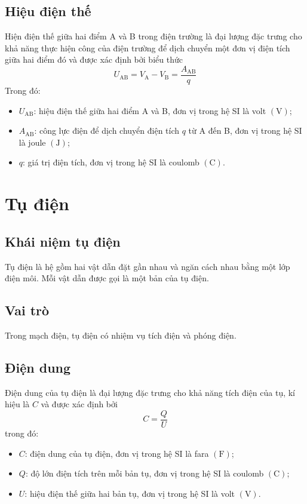 \subsection{Hiệu điện thế}
Hiện điện thế giữa hai điểm A và B trong điện trường là đại lượng đặc trưng cho khả năng thực hiện công của điện trường để dịch chuyển một đơn vị điện tích giữa hai điểm đó và được xác định bởi biểu thức
$$U_\text{AB}=V_\text{A}-V_\text{B}=\dfrac{A_\text{AB}}{q}$$
Trong đó:
\begin{itemize}
	\item $U_\text{AB}$: hiệu điện thế giữa hai điểm A và B, đơn vị trong hệ SI là volt $\left(\si{\volt}\right)$;
	\item $A_\text{AB}$: công lực điện để dịch chuyển điện tích $q$ từ A đến B, đơn vị trong hệ SI là joule $\left(\si{\joule}\right)$;
	\item $q$: giá trị điện tích, đơn vị trong hệ SI là coulomb $\left(\si{\coulomb}\right)$.
\end{itemize}
\section{Tụ điện}
\subsection{Khái niệm tụ điện}
Tụ điện là hệ gồm hai vật dẫn đặt gần nhau và ngăn cách nhau bằng một lớp điện môi. Mỗi vật dẫn được gọi là một bản của tụ điện.
\subsection{Vai trò}
Trong mạch điện, tụ điện có nhiệm vụ tích điện và phóng điện.
\subsection{Điện dung}
Điện dung của tụ điện là đại lượng đặc trưng cho khả năng tích điện của tụ, kí hiệu là $C$ và được xác định bởi
$$C=\dfrac{Q}{U}$$
trong đó:
\begin{itemize}
	\item $C$: điện dung của tụ điện, đơn vị trong hệ SI là fara $\left(\si{\farad}\right)$;
	\item $Q$: độ lớn điện tích trên mỗi bản tụ, đơn vị trong hệ SI là coulomb $\left(\si{\coulomb}\right)$;
	\item $U$: hiệu điện thế giữa hai bản tụ, đơn vị trong hệ SI là volt $\left(\si{\volt}\right)$.
\end{itemize}
